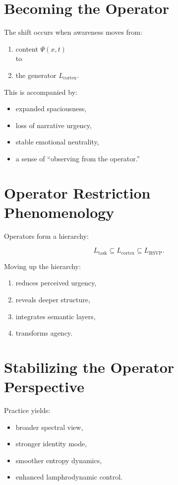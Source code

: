 \documentclass[12pt]{article}
\begin{document}
\section{Becoming the Operator}

The shift occurs when awareness moves from:

\begin{enumerate}
    \item content $\Psi(x,t)$ \\
    to
    \item the generator $L_{\text{cortex}}$.
\end{enumerate}

This is accompanied by:

\begin{itemize}
    \item expanded spaciousness,
    \item loss of narrative urgency,
    \item stable emotional neutrality,
    \item a sense of ``observing from the operator.''
\end{itemize}

\section{Operator Restriction Phenomenology}

Operators form a hierarchy:

\[
L_{\text{task}} \subseteq
L_{\text{cortex}} \subseteq
L_{\text{RSVP}}.
\]

Moving up the hierarchy:

\begin{enumerate}
    \item reduces perceived urgency,
    \item reveals deeper structure,
    \item integrates semantic layers,
    \item transforms agency.
\end{enumerate}

\section{Stabilizing the Operator Perspective}

Practice yields:

\begin{itemize}
    \item broader spectral view,
    \item stronger identity mode,
    \item smoother entropy dynamics,
    \item enhanced lamphrodynamic control.
\end{itemize}
\end{document}
